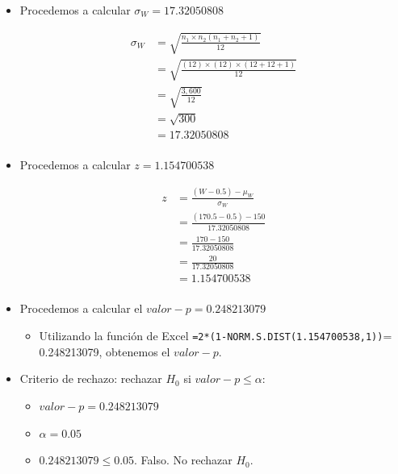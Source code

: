 \begin{enumerate}
\begin{itemize}
            \item Procedemos a calcular $\sigma_W = 17.32050808$
                \begin{center}
                   \begin{align*}
                       \sigma_W &= \sqrt{\frac{n_1\times n_2(n_1+n_2+1)}{12}} \\
                       &= \sqrt{\frac{(12)\times(12)\times(12+12+1)}{12}} \\
                       &= \sqrt{\frac{3,600}{12}} \\
                       &= \sqrt{300} \\
                       &= 17.32050808 \\
                   \end{align*}
                \end{center}
            
            \item Procedemos a calcular $z = 1.154700538$
                \begin{center}
                   \begin{align*}
                       z &= \frac{(W-0.5)-\mu_W}{\sigma_W} \\
                       &= \frac{(170.5-0.5)-150}{17.32050808} \\
                       &= \frac{170-150}{17.32050808} \\ 
                       &= \frac{20}{17.32050808} \\
                       &= 1.154700538 \\ 
                   \end{align*}
                \end{center}
            
            \item Procedemos a calcular el $valor-p = 0.248213079$
                \begin{itemize}
                    \item Utilizando la función de Excel \verb|=2*(1-NORM.S.DIST(1.154700538,1))|= 0.248213079, obtenemos el $valor-p$.
                \end{itemize}
            
            \item Criterio de rechazo: rechazar $H_0$ si $valor-p\leq \alpha $: 
                \begin{itemize}
                    \item $valor-p=0.248213079$
                    \item $\alpha=0.05$ 
                    \item $0.248213079\leq 0.05$. Falso. No rechazar $H_0$. 
                \end{itemize}
        \end{itemize}
    

\end{enumerate}
